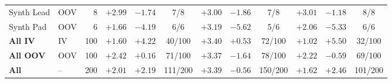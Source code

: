 \begin{table}[t]
\begin{tabular}{@{}llr ccc ccc ccc@{}}
Synth Lead & OOV & 8 & $\mathbf{+2.99}$ & $-1.74$ & 7/8 & $\mathbf{+3.00}$ & $-1.86$ & 7/8 & $\mathbf{+3.01}$ & $-1.18$ & 8/8 \\
Synth Pad & OOV & 6 & $\mathbf{+1.66}$ & $-4.19$ & 6/6 & $\mathbf{+3.19}$ & $-5.62$ & 5/6 & $\mathbf{+2.06}$ & $-5.33$ & 6/6 \\
\midrule
\textbf{All IV} & IV & 100 & $+1.60$ & $\mathbf{+4.22}$ & 40/100 & $\mathbf{+3.40}$ & $+0.53$ & 72/100 & $+1.02$ & $\mathbf{+5.50}$ & 32/100 \\
\textbf{All OOV} & OOV & 100 & $\mathbf{+2.42}$ & $+0.16$ & 71/100 & $\mathbf{+3.37}$ & $-1.64$ & 78/100 & $\mathbf{+2.22}$ & $-0.59$ & 69/100 \\
\textbf{All} & -- & 200 & $+2.01$ & $\mathbf{+2.19}$ & 111/200 & $\mathbf{+3.39}$ & $-0.56$ & 150/200 & $+1.62$ & $\mathbf{+2.46}$ & 101/200 \\
\bottomrule
\end{tabular}
\end{table}
